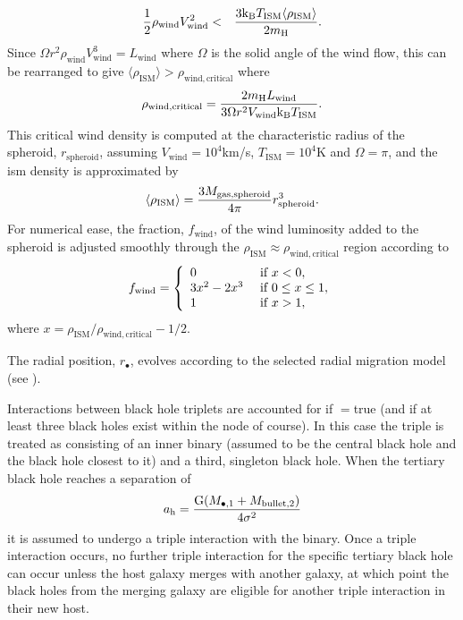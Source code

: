 \begin{description}
\begin{eqnarray}
 \frac{1}{2}\rho_\mathrm{wind} V_\mathrm{wind}^2 &<& {3 \mathrm{k_B} T_\mathrm{ISM} \langle \rho_\mathrm{ISM}\rangle \over 2 m_\mathrm{H}}.
\end{eqnarray}
Since $\Omega r^2 \rho_\mathrm{wind} V_\mathrm{wind}^3 = L_\mathrm{wind}$ where $\Omega$ is the solid angle of the wind flow, this can be rearranged to give $\langle\rho_\mathrm{ISM}\rangle > \rho_\mathrm{wind, critical}$ where
\begin{equation}
\rho_\mathrm{wind,critical} = {2 m_\mathrm{H} L_\mathrm{wind} \over 3 \Omega r^2 V_\mathrm{wind} \mathrm{k_B} T_\mathrm{ISM}}.
\end{equation}
This critical wind density is computed at the characteristic radius of the spheroid, $r_\mathrm{spheroid}$, assuming $V_\mathrm{wind}=10^4$km/s, $T_\mathrm{ISM}=10^4$K and $\Omega=\pi$, and the \gls{ism} density is approximated by
\begin{equation}
 \langle\rho_\mathrm{ISM}\rangle = {3 M_\mathrm{gas, spheroid} \over 4 \pi} r_\mathrm{spheroid}^3.
\end{equation}
For numerical ease, the fraction, $f_\mathrm{wind}$, of the wind luminosity added to the spheroid is adjusted smoothly through the $\rho_\mathrm{ISM}\approx\rho_\mathrm{wind,critical}$ region according to
\begin{equation}
 f_\mathrm{wind} = \left\{ \begin{array}{ll} 0 & \hbox{ if } x < 0, \\ 3x^2-2x^3 & \hbox{ if } 0 \le x \le 1, \\ 1 & \hbox{ if } x > 1, \end{array} \right.
\end{equation}
where $x=\rho_\mathrm{ISM}/\rho_\mathrm{wind,critical}-1/2$.
\end{description}

The radial position, $r_\bullet$, evolves according to the selected radial migration model (see ).

Interactions between black hole triplets are accounted for if {\normalfont \ttfamily [tripleBlackHoleInteraction]}$=${\normalfont \ttfamily true} (and if at least three black holes exist within the \gls{node} of course). In this case the triple is treated as consisting of an inner binary (assumed to be the central black hole and the black hole closest to it) and a third, singleton black hole. When the tertiary black hole reaches a separation of 
\begin{equation}
a_\mathrm{h}= {\mathrm{G} (M_{\bullet, 1} + M_\mathrm{bullet, 2}) \over 4 \sigma^2}
\end{equation}
it is assumed to undergo a triple interaction with the binary. Once a triple interaction occurs, no further triple interaction for the specific tertiary black hole can occur unless the host galaxy merges with another galaxy, at which point the black holes from the merging galaxy are eligible for another triple interaction in their new host.

